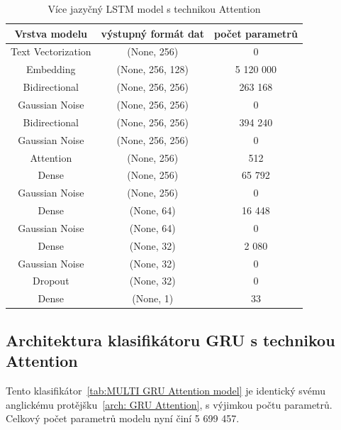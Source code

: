 \begin{table}[H]
	\centering
	\caption{Více jazyčný LSTM model s technikou Attention}\label{tab:MULTI LSTM Attention model}
	\begin{tabular}{ c c c }
			\toprule
			Vrstva modelu & výstupný formát dat & počet parametrů\\
			\midrule
            Text Vectorization & (None, 256) & 0\\         
            Embedding & (None, 256, 128) & 5 120 000\\   
            Bidirectional & (None, 256, 256) & 263 168\\    
			Gaussian Noise & (None, 256, 256) & 0\\
            Bidirectional & (None, 256, 256) & 394 240\\
			Gaussian Noise & (None, 256, 256) & 0\\
			Attention & (None, 256) & 512\\
            Dense & (None, 256) & 65 792\\ 
			Gaussian Noise & (None, 256) & 0\\
			Dense & (None, 64) & 16 448\\ 
			Gaussian Noise & (None, 64) & 0\\
			Dense & (None, 32) & 2 080\\ 
			Gaussian Noise & (None, 32) & 0\\
            Dropout & (None, 32) & 0\\   
            Dense & (None, 1) & 33\\ 
			\midrule
		\end{tabular}
\end{table}

\subsection{Architektura klasifikátoru GRU s technikou Attention}
Tento klasifikátor~\ref{tab:MULTI GRU Attention model} je identický svému anglickému protějšku~\ref{arch: GRU Attention}, s výjimkou počtu parametrů.
Celkový počet parametrů modelu nyní činí 5 699 457.


